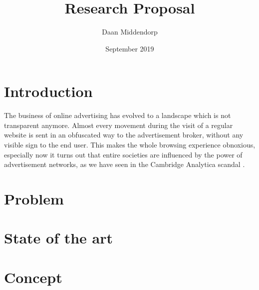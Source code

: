 \documentclass[]{article}
\title{Research Proposal}
\author{Daan Middendorp}
\date{September 2019}
\begin{document}
\maketitle

\begin{abstract}

\end{abstract}

\section{Introduction}

The business of online advertising has evolved to a landscape which is not transparent anymore. Almost every movement during the visit of a regular website is sent in an obfuscated way to the advertisement broker, without any visible sign to the end user. This makes the whole browsing experience obnoxious, especially now it turns out that entire societies are influenced by the power of advertisement networks, as we have seen in the Cambridge Analytica scandal .


\section{Problem}

\section{State of the art}

\section {Concept}
\end{document}
